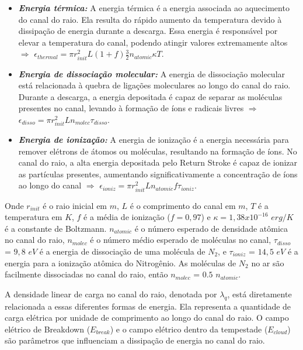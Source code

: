 \documentclass[a4paper, 12pt, onecolumn,singlespacing]{article}
\begin{document}
	\begin{itemize}
		\item \textbf{\textit{Energia térmica:}} A energia térmica é a energia associada ao aquecimento do canal do raio. Ela resulta do rápido aumento da temperatura devido à dissipação de energia durante a descarga. Essa energia é responsável por elevar a temperatura do canal, podendo atingir valores extremamente altos $\Rightarrow$ $\epsilon_{thermal} = \pi r_{init}^2 L(1+f) \frac{3}{2} n_{atomic} \kappa T$.
		
		\item \textbf{\textit{Energia de dissociação molecular:}} A energia de dissociação molecular está relacionada à quebra de ligações moleculares ao longo do canal do raio. Durante a descarga, a energia depositada é capaz de separar as moléculas presentes no canal, levando à formação de íons e radicais livres $\Rightarrow$ $\epsilon_{disso} = \pi r_{init}^2 L n_{molec} \tau_{disso}$.
		
		\item \textbf{\textit{Energia de ionização:}} A energia de ionização é a energia necessária para remover elétrons de átomos ou moléculas, resultando na formação de íons. No canal do raio, a alta energia depositada pelo Return Stroke é capaz de ionizar as partículas presentes, aumentando significativamente a concentração de íons ao longo do canal $\Rightarrow$ $\epsilon_{ioniz} = \pi r_{init}^2 L n_{atomic} f \tau_{ioniz}$.
		
	\end{itemize}

	Onde $r_{init}$ é o raio inicial em $m$, $L$ é o comprimento do canal em $m$, $T$ é a temperatura em $K$, $f$ é a média de ionização ($f = 0,97$) e $\kappa = 1,38 x 10^{-16}$ $erg/K$ é a constante de Boltzmann. $n_{atomic}$ é o número esperado de densidade atômica no canal do raio, $n_{molec}$ é o número médio esperado de moléculas no canal, $\tau_{disso}$ = $9,8$ $eV$ é a energia de dissociação de uma molécula de $N_2$, e $\tau_{ioniz}$ = $14,5$ $eV$ é a energia para a ionização atômica do Nitrogênio. As moléculas de $N_2$ no ar são facilmente dissociadas no canal do raio, então $n_{molec}$ = $0.5$ $n_{atomic}$.

	A densidade linear de carga no canal do raio, denotada por $\lambda_q$, está diretamente relacionada a essas diferentes formas de energia. Ela representa a quantidade de carga elétrica por unidade de comprimento ao longo do canal do raio. O campo elétrico de Breakdown ($E_{break}$) e o campo elétrico dentro da tempestade ($E_{cloud}$) são parâmetros que influenciam a dissipação de energia no canal do raio.
	
\end{document}

